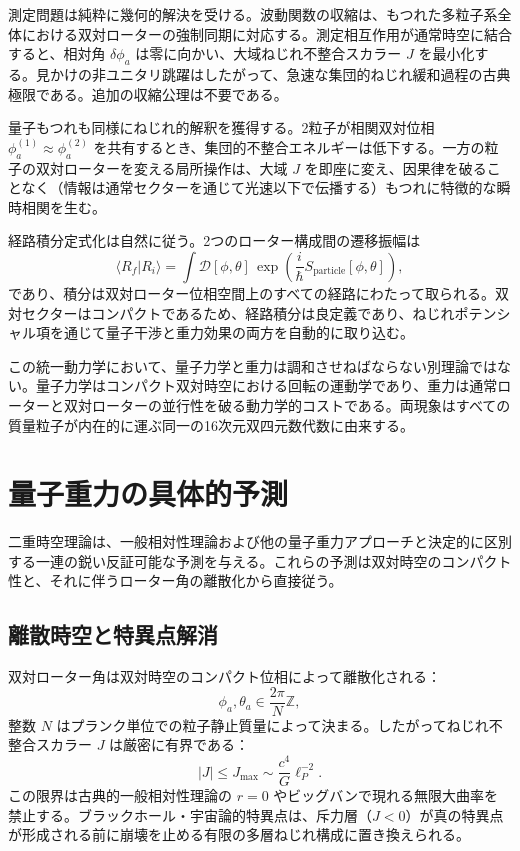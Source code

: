 \documentclass[a4paper]{article}
\begin{document}
測定問題は純粋に幾何的解決を受ける。波動関数の収縮は、もつれた多粒子系全体における双対ローターの強制同期に対応する。測定相互作用が通常時空に結合すると、相対角 $\delta\phi_a$ は零に向かい、大域ねじれ不整合スカラー $J$ を最小化する。見かけの非ユニタリ跳躍はしたがって、急速な集団的ねじれ緩和過程の古典極限である。追加の収縮公理は不要である。

量子もつれも同様にねじれ的解釈を獲得する。2粒子が相関双対位相 $\phi_a^{(1)} \approx \phi_a^{(2)}$ を共有するとき、集団的不整合エネルギーは低下する。一方の粒子の双対ローターを変える局所操作は、大域 $J$ を即座に変え、因果律を破ることなく（情報は通常セクターを通じて光速以下で伝播する）もつれに特徴的な瞬時相関を生む。

経路積分定式化は自然に従う。2つのローター構成間の遷移振幅は
\[
\langle R_f | R_i \rangle = \int \mathcal{D}[\phi,\theta] \, \exp\left( \frac{i}{\hbar} S_\text{particle}[\phi,\theta] \right),
\]
であり、積分は双対ローター位相空間上のすべての経路にわたって取られる。双対セクターはコンパクトであるため、経路積分は良定義であり、ねじれポテンシャル項を通じて量子干渉と重力効果の両方を自動的に取り込む。

この統一動力学において、量子力学と重力は調和させねばならない別理論ではない。量子力学はコンパクト双対時空における回転の運動学であり、重力は通常ローターと双対ローターの並行性を破る動力学的コストである。両現象はすべての質量粒子が内在的に運ぶ同一の16次元双四元数代数に由来する。

\section{量子重力の具体的予測}
\label{sec:predictions}

二重時空理論は、一般相対性理論および他の量子重力アプローチと決定的に区別する一連の鋭い反証可能な予測を与える。これらの予測は双対時空のコンパクト性と、それに伴うローター角の離散化から直接従う。

\subsection{離散時空と特異点解消}

双対ローター角は双対時空のコンパクト位相によって離散化される：
\[
\phi_a, \theta_a \in \frac{2\pi}{N}\mathbb{Z},
\]
整数 $N$ はプランク単位での粒子静止質量によって決まる。したがってねじれ不整合スカラー $J$ は厳密に有界である：
\[
|J| \leq J_\text{max} \sim \frac{c^4}{G} \ell_P^{-2}.
\]
この限界は古典的一般相対性理論の $r=0$ やビッグバンで現れる無限大曲率を禁止する。ブラックホール・宇宙論的特異点は、斥力層（$J < 0$）が真の特異点が形成される前に崩壊を止める有限の多層ねじれ構成に置き換えられる。
\end{document}
